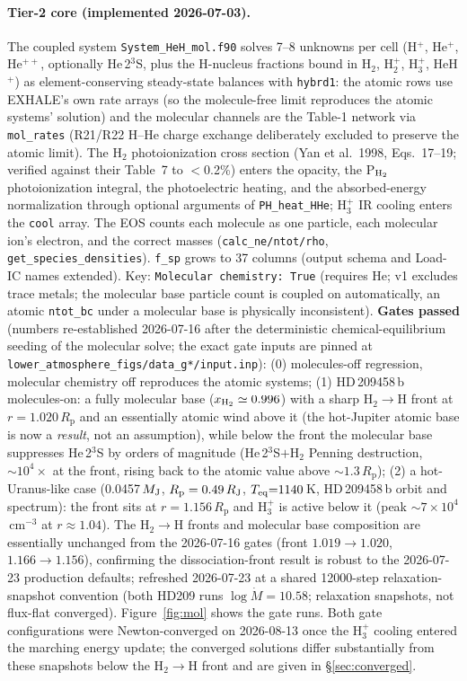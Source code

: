 \documentclass[english,a4paper]{my_memo}
\newcommand{\Rp}{R_{\mathrm{p}}}
\newcommand{\Mdot}{\dot{M}}
\begin{document}
\paragraph{Tier-2 core (implemented 2026-07-03).} The coupled system
\texttt{System\_HeH\_mol.f90} solves 7--8 unknowns per cell (H$^+$, He$^+$, He$^{++}$,
optionally He\,2$^3$S, plus the H-nucleus fractions bound in H$_2$, H$_2^+$, H$_3^+$,
HeH$^+$) as element-conserving steady-state balances with \texttt{hybrd1}: the atomic
rows use EXHALE's own rate arrays (so the molecule-free limit reproduces the atomic
systems' solution) and the molecular channels are the Table-1 network via
\texttt{mol\_rates} (R21/R22 H--He charge exchange deliberately excluded to preserve
the atomic limit). The H$_2$ photoionization cross section (Yan et al.\ 1998,
Eqs.~17--19; verified against their Table~7 to $<$0.2\%) enters the opacity, the P$_{\rm H_2}$
photoionization integral, the photoelectric heating, and the absorbed-energy
normalization through optional arguments of \texttt{PH\_heat\_HHe}; H$_3^+$ IR cooling
enters the \texttt{cool} array. The EOS counts each molecule as one particle, each
molecular ion's electron, and the correct masses (\texttt{calc\_ne/ntot/rho},
\texttt{get\_species\_densities}). \texttt{f\_sp} grows to 37 columns (output schema
and Load-IC names extended). Key: \texttt{Molecular chemistry: True} (requires He; v1
excludes trace metals; the molecular base particle count is coupled on automatically,
an atomic \texttt{ntot\_bc} under a molecular base is physically inconsistent).
\textbf{Gates passed} (numbers re-established 2026-07-16 after the deterministic
chemical-equilibrium seeding of the molecular solve; the exact gate inputs are pinned at
\texttt{lower\_atmosphere\_figs/data\_g*/input.inp}): (0) molecules-off regression,
molecular chemistry off reproduces the atomic systems; (1) HD\,209458\,b molecules-on: a
fully molecular base ($x_{\rm H_2}\simeq0.996$) with a sharp H$_2\to$H front at
$r=1.020\,\Rp$ and an essentially atomic wind above it (the hot-Jupiter atomic base
is now a \emph{result}, not an assumption), while below the front the molecular base
suppresses He\,2$^3$S by orders of magnitude (He\,2$^3$S$+$H$_2$ Penning destruction,
${\sim}10^4\times$ at the front, rising back to the atomic value above ${\sim}1.3\,\Rp$);
(2) a hot-Uranus-like case (0.0457\,$M_{\rm J}$, $R_{\rm p}=0.49\,R_{\rm J}$,
$T_{\rm eq}{=}1140$\,K, HD\,209458\,b orbit and spectrum): the front sits at
$r=1.156\,\Rp$ and H$_3^+$ is active below it (peak ${\sim}7{\times}10^4$\,cm$^{-3}$ at
$r{\approx}1.04$). The H$_2\to$H fronts and molecular base composition are essentially
unchanged from the 2026-07-16 gates (front $1.019{\to}1.020$, $1.166{\to}1.156$),
confirming the dissociation-front result is robust to the 2026-07-23 production defaults;
refreshed 2026-07-23 at a shared 12000-step relaxation-snapshot convention (both HD209
runs $\log\Mdot=10.58$; relaxation snapshots, not flux-flat converged).
Figure~\ref{fig:mol} shows the gate runs. Both gate configurations were
Newton-converged on 2026-08-13 once the H$_3^+$ cooling entered the marching
energy update; the converged solutions differ substantially from these
snapshots below the H$_2\to$H front and are given in \S\ref{sec:converged}.
\end{document}
